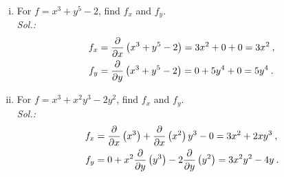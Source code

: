 \begin{example}
\begin{enumerate}[(i)]
	\item For $f = x^3 + y^5 - 2$, find $f_x$ and $f_y$.\\
	{\it Sol.:}
	\begin{equation*}
	\begin{split}
	f_x & = \displaystyle{\frac{\partial }{\partial x}} \left( x^3 + y^5 - 2 \right) = 3x^2+0+0 = 3x^2 \:, \\
	f_y & = \displaystyle{\frac{\partial }{\partial y}} \left( x^3 + y^5 - 2 \right) = 0+5y^4+0 = 5y^4 \:. 
	\end{split}
	\end{equation*}
	\item For $f=x^3+x^2y^3 -2 y^2$, find $f_x$ and $f_y$.\\
	{\it Sol.:}
	\begin{equation*}
	\begin{split}
	f_x & = \displaystyle{\frac{\partial }{\partial x}} \left( x^3 \right) + \displaystyle{\frac{\partial }{\partial x}} \left( x^2 \right)y^3 - 0 = 3x^2 +2xy^3 \:, \\
	f_y & = 0 + x^2 \displaystyle{\frac{\partial }{\partial y}} \left( y^3 \right) - 2 \displaystyle{\frac{\partial }{\partial y}}\left( y^2 \right) = 3x^2y^2 -4y \:. \\
	\end{split}
	\end{equation*}
\end{enumerate}
\end{example}

